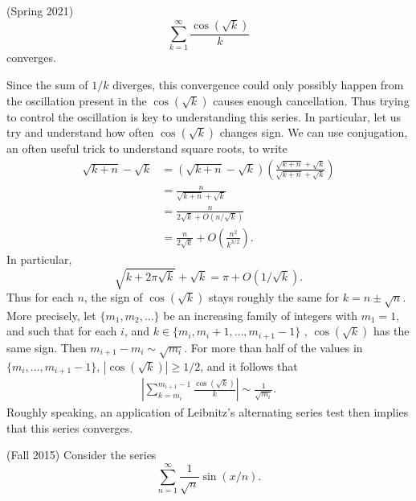 \documentclass[answers]{exam}
\DeclareMathOperator{\RR}{\mathbb{R}}
\theoremstyle{problemstyle}
\newcommand{\1}[1]{\textbf{1}_{\left[#1\right]}} %
\begin{document}
\begin{questions}
\question (Spring 2021)
%
\[ \sum_{k = 1}^\infty \frac{\cos(\sqrt{k})}{k} \]
%
converges.
\begin{solution}
    Since the sum of $1/k$ diverges, this convergence could only possibly happen from the oscillation present in the $\cos(\sqrt{k})$ causes enough cancellation. Thus trying to control the oscillation is key to understanding this series. In particular, let us try and understand how often $\cos(\sqrt{k})$ changes sign. We can use conjugation, an often useful trick to understand square roots, to write
    \begin{align*}
        \sqrt{k+n} - \sqrt{k} &= (\sqrt{k+n} - \sqrt{k}) \left( \frac{\sqrt{k+n} + \sqrt{k}}{\sqrt{k+n} + \sqrt{k}} \right)\\
        &= \frac{n}{\sqrt{k+n} + \sqrt{k}}\\
        &= \frac{n}{2\sqrt{k} + O(n/\sqrt{k})}\\
        &= \frac{n}{2\sqrt{k}} + O \left( \frac{n^2}{k^{3/2}} \right).
    \end{align*}
    In particular,
    \[ \sqrt{k + 2 \pi \sqrt{k}} + \sqrt{k} = \pi + O(1/\sqrt{k}). \]
    Thus for each $n$, the sign of $\cos(\sqrt{k})$ stays roughly the same for $k = n \pm \sqrt{n}$. More precisely, let $\{ m_1, m_2, \dots \}$ be an increasing family of integers with $m_1 = 1$, and such that for each $i$, and $k \in \{ m_i, m_i + 1, \dots, m_{i+1} - 1 \}$ , $\cos(\sqrt{k})$ has the same sign. Then $m_{i+1} - m_i \sim \sqrt{m_i}$. For more than half of the values in $\{ m_i, \dots, m_{i+1} - 1 \}$, $|\cos(\sqrt{k})| \geq 1/2$, and it follows that
    \begin{align*}
        \left| \sum_{k = m_i}^{m_{i+1} - 1} \frac{\cos(\sqrt{k})}{k} \right| \sim \frac{1}{\sqrt{m_i}}.
    \end{align*}
    Roughly speaking, an application of Leibnitz's alternating series test then implies that this series converges.
\end{solution}


\question (Fall 2015) Consider the series
%
$$ \sum_{n = 1}^\infty \frac{1}{\sqrt{n}} \sin(x/n). $$
%
\end{questions}
\end{document}
